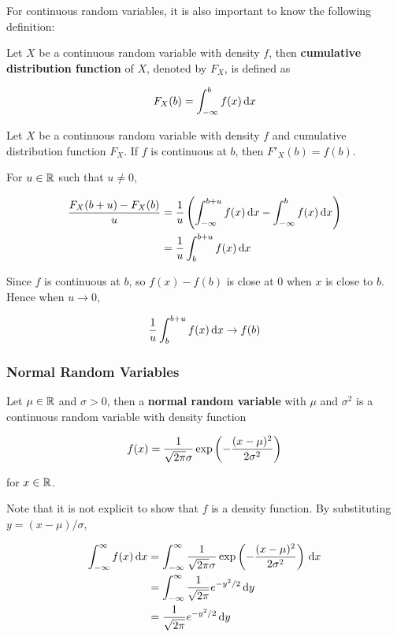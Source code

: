 \documentclass[a4paper,12pt]{article}
\begin{document}
For continuous random variables, it is also important to know the following definition:\n

\begin{dft}
  Let $X$ be a continuous random variable with density $f$, then \textbf{cumulative distribution function} of $X$, denoted by $F_{X}$, is defined as

  $$F_{X}(b)=\int_{-\infty}^{b}f(x)\,\mathrm{d} x$$
\end{dft}\n

\begin{pst}
  Let $X$ be a continuous random variable with density $f$ and cumulative distribution function $F_{X}$. If $f$ is continuous at $b$, then $F'_{X}(b)=f(b)$.\n

  \prf For $u\in\mathbb{R}$ such that $u\neq 0$,

  $$\begin{aligned}[t]
    \frac{F_{X}(b+u)-F_{X}(b)}{u}&=\frac{1}{u}\left( \int_{-\infty}^{b+u}f(x)\,\mathrm{d} x-\int_{-\infty}^{b}f(x)\,\mathrm{d} x\right)\\
    &=\frac{1}{u}\int_{b}^{b+u}f(x)\,\mathrm{d} x
  \end{aligned}$$\s

  Since $f$ is continuous at $b$, so $f(x)-f(b)$ is close at $0$ when $x$ is close to $b$. Hence when $u\to 0$,

  $$\frac{1}{u}\int_{b}^{b+u}f(x)\,\mathrm{d} x\to f(b)$$
\end{pst}

\subsubsection{Normal Random Variables}
\begin{dft}
  Let $\mu\in\mathbb{R}$ and $\sigma>0$, then a \textbf{normal random variable} with $\mu$ and $\sigma^{2}$ is a continuous random variable with density function

  $$f(x)=\frac{1}{\sqrt{2\pi}\sigma}\exp\left( -\frac{(x-\mu)^{2}}{2\sigma^{2}}\right)$$\s

  for $x\in\mathbb{R}$.
\end{dft}\n

Note that it is not explicit to show that $f$ is a density function. By substituting $y=(x-\mu)/\sigma$,

$$\begin{aligned}[t]
  \int_{-\infty}^{\infty}f(x)\,\mathrm{d} x&=\int_{-\infty}^{\infty}\frac{1}{\sqrt{2\pi}\sigma}\exp\left( -\frac{(x-\mu)^{2}}{2\sigma^{2}}\right)\,\mathrm{d} x\\
  &=\int_{-\infty}^{\infty}\frac{1}{\sqrt{2\pi}}e^{-y^{2}/2}\,\mathrm{d} y\\
  &=\frac{1}{\sqrt{2\pi}}e^{-y^{2}/2}\,\mathrm{d} y
\end{aligned}$$\s
\end{document}
